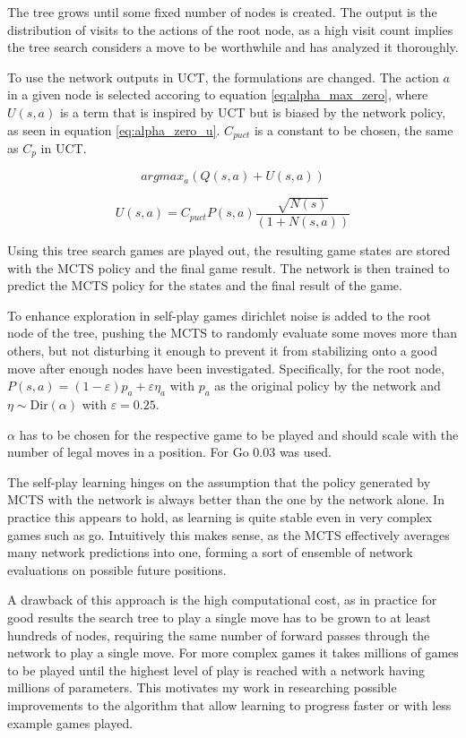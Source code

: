 \documentclass[12pt,onecolumn,oneside,titlepage]{article}
\begin{document}
The tree grows until some fixed number of nodes is created. The output is the distribution of visits to the actions of the root node, as a high visit count implies the tree search considers a move to be worthwhile and has analyzed it thoroughly.

To use the network outputs in UCT, the formulations are changed. The action $a$ in a given node is selected accoring to equation \ref{eq:alpha_max_zero}, where $U(s,a)$ is a term that is inspired by UCT but is biased by the network policy, as seen in equation \ref{eq:alpha_zero_u}.
$C_{puct}$ is a constant to be chosen, the same as $C_p$ in UCT.

\begin{equation}
 argmax_a(Q(s, a) + U(s, a))\label{eq:alpha_max_zero}
\end{equation}

\begin{equation}
 U(s,a) = C_{puct} P(s,a) \frac{\sqrt{N(s)}}{(1+N(s,a))}\label{eq:alpha_zero_u}
\end{equation}

Using this tree search games are played out, the resulting game states are stored with the MCTS policy and the final game result. The network is then trained to predict the MCTS policy for the states and the final result of the game.

To enhance exploration in self-play games dirichlet noise is added to the root node of the tree, pushing the MCTS to randomly evaluate some moves more than others, but not disturbing it enough to prevent it from stabilizing onto a good move after enough nodes have been investigated.
Specifically, for the root node, $P(s, a) = (1 - \varepsilon)p_a+ \varepsilon \eta_a$ with $p_a$ as the original policy by the network and $\eta \sim \text{Dir}(\alpha)$ with $\varepsilon = 0.25$.

$\alpha$ has to be chosen for the respective game to be played
and should scale with the number of legal moves in a position. For Go $0.03$ was used.

The self-play learning hinges on the assumption that the policy generated by MCTS with the network is always better than the one by the network alone. In practice this appears to hold, as learning is quite stable even in very complex games such as go. Intuitively this makes sense,
as the MCTS effectively averages many network predictions into one, forming a sort of ensemble of network evaluations on possible future positions.

A drawback of this approach is the high computational cost, as in practice for good results the search tree to play a single move has to be grown to at least hundreds of nodes, requiring the same number of forward passes through the network to play a single move.
For more complex games it takes millions of games to be played until the highest level of play is reached with a network having millions of parameters. This motivates my work in researching possible improvements to the algorithm that allow learning to progress
faster or with less example games played.
\end{document}

